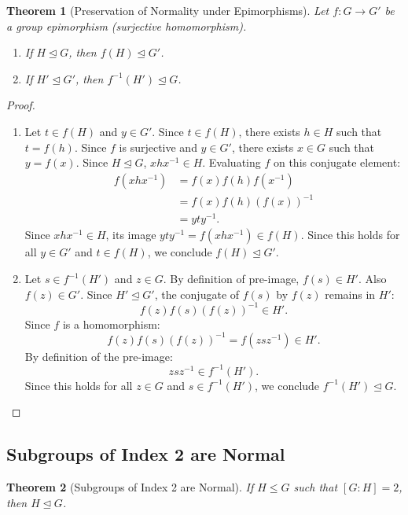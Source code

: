 \documentclass[12pt]{article}
\theoremstyle{definition}
\theoremstyle{plain}
\newtheorem{theorem}{Theorem}[section]
\begin{document}
\begin{theorem}[Preservation of Normality under Epimorphisms]
Let $f: G \longrightarrow G'$ be a group epimorphism (surjective homomorphism).
\begin{enumerate}
    \item If $H \trianglelefteq G$, then $f(H) \trianglelefteq G'$.
    \item If $H' \trianglelefteq G'$, then $f^{-1}(H') \trianglelefteq G$.
\end{enumerate}
\end{theorem}
\begin{proof}
\begin{enumerate}
    \item Let $t \in f(H)$ and $y \in G'$.
    Since $t \in f(H)$, there exists $h \in H$ such that $t = f(h)$.
    Since $f$ is surjective and $y \in G'$, there exists $x \in G$ such that $y = f(x)$.
    Since $H \trianglelefteq G$, $x h x^{-1} \in H$.
    Evaluating $f$ on this conjugate element:
    \begin{align*}
        f(x h x^{-1}) &= f(x) f(h) f(x^{-1}) \\
        &= f(x) f(h) (f(x))^{-1} \\
        &= y t y^{-1}.
    \end{align*}
    Since $x h x^{-1} \in H$, its image $y t y^{-1} = f(x h x^{-1}) \in f(H)$.
    Since this holds for all $y \in G'$ and $t \in f(H)$, we conclude $f(H) \trianglelefteq G'$.
    
    \item Let $s \in f^{-1}(H')$ and $z \in G$.
    By definition of pre-image, $f(s) \in H'$. Also $f(z) \in G'$.
    Since $H' \trianglelefteq G'$, the conjugate of $f(s)$ by $f(z)$ remains in $H'$:
    \[
    f(z) f(s) (f(z))^{-1} \in H'.
    \]
    Since $f$ is a homomorphism:
    \[
    f(z) f(s) (f(z))^{-1} = f(z s z^{-1}) \in H'.
    \]
    By definition of the pre-image:
    \[
    z s z^{-1} \in f^{-1}(H').
    \]
    Since this holds for all $z \in G$ and $s \in f^{-1}(H')$, we conclude $f^{-1}(H') \trianglelefteq G$.
\end{enumerate}
\end{proof}


\subsection{Subgroups of Index 2 are Normal}

\begin{theorem}[Subgroups of Index 2 are Normal]
If $H \le G$ such that $[G : H] = 2$, then $H \trianglelefteq G$.
\end{theorem}
\end{document}
